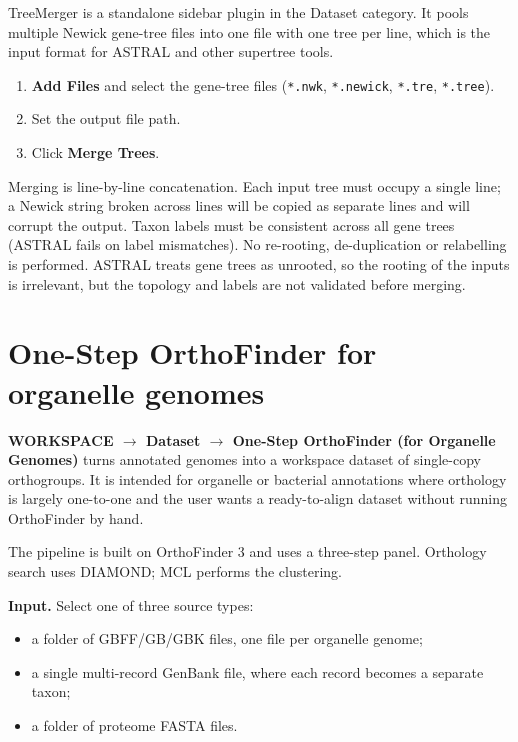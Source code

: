 \documentclass[10pt]{report}
\begin{document}
TreeMerger is a standalone sidebar plugin in the Dataset category. It pools
multiple Newick gene-tree files into one file with one tree per line, which is
the input format for ASTRAL and other supertree tools.

\begin{enumerate}
  \item \textbf{Add Files} and select the gene-tree files
        (\texttt{*.nwk}, \texttt{*.newick}, \texttt{*.tre}, \texttt{*.tree}).
  \item Set the output file path.
  \item Click \textbf{Merge Trees}.
\end{enumerate}

Merging is line-by-line concatenation. Each input tree must occupy a single
line; a Newick string broken across lines will be copied as separate lines and
will corrupt the output. Taxon labels must be consistent across all gene trees
(ASTRAL fails on label mismatches). No re-rooting, de-duplication or
relabelling is performed. ASTRAL treats gene trees as unrooted, so the rooting
of the inputs is irrelevant, but the topology and labels are not validated
before merging.

\section{One-Step OrthoFinder for organelle genomes}

\textbf{WORKSPACE $\rightarrow$ Dataset $\rightarrow$ One-Step OrthoFinder (for
Organelle Genomes)} turns annotated genomes into a workspace dataset of
single-copy orthogroups. It is intended for organelle or bacterial annotations
where orthology is largely one-to-one and the user wants a ready-to-align
dataset without running OrthoFinder by hand.

The pipeline is built on OrthoFinder 3 \cite{orthofinder} and uses a three-step
panel. Orthology search uses DIAMOND; MCL performs the clustering.

\textbf{Input.} Select one of three source types:

\begin{itemize}
  \item a folder of GBFF/GB/GBK files, one file per organelle genome;
  \item a single multi-record GenBank file, where each record becomes a
        separate taxon;
  \item a folder of proteome FASTA files.
\end{itemize}
\end{document}
